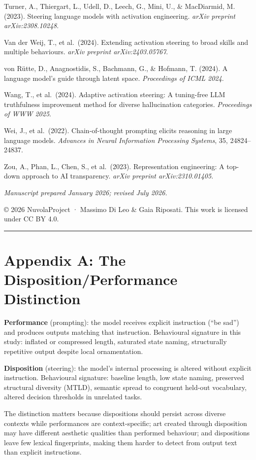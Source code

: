 \documentclass[11pt,a4paper]{article}
\begin{document}
Turner, A., Thiergart, L., Udell, D., Leech, G., Mini, U., \& MacDiarmid, M. (2023). Steering language models with activation engineering. \emph{arXiv preprint arXiv:2308.10248}.

Van der Weij, T., et al.~(2024). Extending activation steering to broad skills and multiple behaviours. \emph{arXiv preprint arXiv:2403.05767}.

von Rütte, D., Anagnostidis, S., Bachmann, G., \& Hofmann, T. (2024). A language model's guide through latent space. \emph{Proceedings of ICML 2024}.

Wang, T., et al.~(2024). Adaptive activation steering: A tuning-free LLM truthfulness improvement method for diverse hallucination categories. \emph{Proceedings of WWW 2025}.

Wei, J., et al.~(2022). Chain-of-thought prompting elicits reasoning in large language models. \emph{Advances in Neural Information Processing Systems}, 35, 24824--24837.

Zou, A., Phan, L., Chen, S., et al.~(2023). Representation engineering: A top-down approach to AI transparency. \emph{arXiv preprint arXiv:2310.01405}.

\emph{Manuscript prepared January 2026; revised July 2026.}

© 2026 NuvolaProject · Massimo Di Leo \& Gaia Riposati. This work is licensed under CC BY 4.0.

\begin{center}\rule{0.5\linewidth}{0.5pt}\end{center}

\section*{Appendix A: The Disposition/Performance Distinction}

\textbf{Performance} (prompting): the model receives explicit instruction (``be sad'') and produces outputs matching that instruction. Behavioural signature in this study: inflated or compressed length, saturated state naming, structurally repetitive output despite local ornamentation.

\textbf{Disposition} (steering): the model's internal processing is altered without explicit instruction. Behavioural signature: baseline length, low state naming, preserved structural diversity (MTLD), semantic spread to congruent held-out vocabulary, altered decision thresholds in unrelated tasks.

The distinction matters because dispositions should persist across diverse contexts while performances are context-specific; art created through disposition may have different aesthetic qualities than performed behaviour; and dispositions leave few lexical fingerprints, making them harder to detect from output text than explicit instructions.
\end{document}
